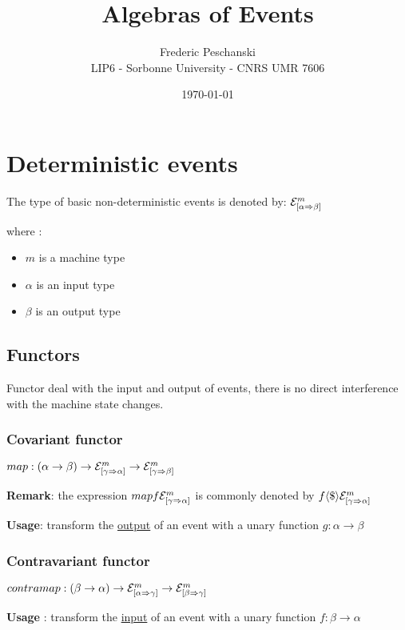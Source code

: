 \documentclass{article}
\title{Algebras of Events}
\author{Frederic Peschanski\\LIP6 - Sorbonne University - CNRS UMR 7606}
\date{\today}
\newcommand{\EV}[3]{\ensuremath{{\cal{E}}^{#1}_{[#2 \Rightarrow #3]}}}
\newcommand{\FMAP}{\ensuremath{\langle \$ \rangle}}
\begin{document}
\maketitle

\section{Deterministic events}

The type of basic non-deterministic events is denoted by: $\EV{m}{\alpha}{\beta}$

where :

\begin{itemize}
\item $m$ is a machine type
\item $\alpha$ is an input type
\item $\beta$ is an output type
\end{itemize}

\subsection{Functors}

Functor deal with the input and output of events, there is no direct interference with the machine state
 changes.

\subsubsection*{Covariant functor}

$map: (\alpha \rightarrow \beta) \rightarrow  \EV{m}{\gamma}{\alpha} \rightarrow \EV{m}{\gamma}{\beta}$

\textbf{Remark}: the expression $map f \EV{m}{\gamma}{\alpha}$ is commonly denoted by $f \FMAP \EV{m}{\gamma}{\alpha}$ 

\textbf{Usage}: transform the \underline{output} of an event with a unary function $g : \alpha \rightarrow \beta$

\subsubsection*{Contravariant functor}

$contramap: (\beta \rightarrow \alpha) \rightarrow  \EV{m}{\alpha}{\gamma} \rightarrow \EV{m}{\beta}{\gamma}$

\textbf{Usage} : transform the \underline{input} of an event with a unary function $f : \beta \rightarrow \alpha$
\end{document}
